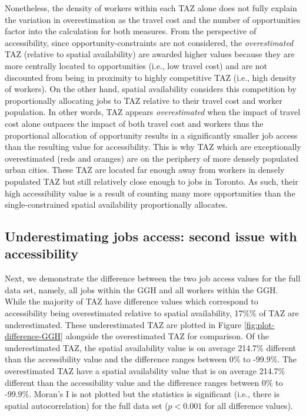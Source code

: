 \documentclass[]{elsarticle} %
\begin{document}
Nonetheless, the density of workers within each TAZ alone does not fully
explain the variation in overestimation as the travel cost and the
number of opportunities factor into the calculation for both measures.
From the perspective of accessibility, since opportunity-constraints are
not considered, the \emph{overestimated} TAZ (relative to spatial
availability) are awarded higher values because they are more centrally
located to opportunities (i.e., low travel cost) and are not discounted
from being in proximity to highly competitive TAZ (i.e., high density of
workers). On the other hand, spatial availability considers this
competition by proportionally allocating jobs to TAZ relative to their
travel cost and worker population. In other words, TAZ appears
\emph{overestimated} when the impact of travel cost alone outpaces the
impact of both travel cost and workers thus the proportional allocation
of opportunity results in a significantly smaller job access than the
resulting value for accessibility. This is why TAZ which are
exceptionally overestimated (reds and oranges) are on the periphery of
more densely populated urban cities. These TAZ are located far enough
away from workers in densely populated TAZ but still relatively close
enough to jobs in Toronto. As such, their high accessibility value is a
result of counting many more opportunities than the single-constrained
spatial availability proportionally allocates.

\hypertarget{underestimating-jobs-access-second-issue-with-accessibility}{%
\subsection{Underestimating jobs access: second issue with
accessibility}\label{underestimating-jobs-access-second-issue-with-accessibility}}

Next, we demonstrate the difference between the two job access values
for the full data set, namely, all jobs within the GGH and all workers
within the GGH. While the majority of TAZ have difference values which
correspond to accessibility being overestimated relative to spatial
availability, 17\%\% of TAZ are underestimated. These underestimated TAZ
are plotted in Figure \ref{fig:plot-difference-GGH} alongside the
overestimated TAZ for comparison. Of the underestimated TAZ, the spatial
availability value is on average 214.7\% different than the
accessibility value and the difference ranges between 0\% to -99.9\%.
The overestimated TAZ have a spatial availability value that is on
average 214.7\% different than the accessibility value and the
difference ranges between 0\% to -99.9\%. Moran's I is not plotted but
the statistics is significant (i.e., there is spatial autocorrelation)
for the full data set (\(p< 0.001\) for all difference values).
\end{document}
